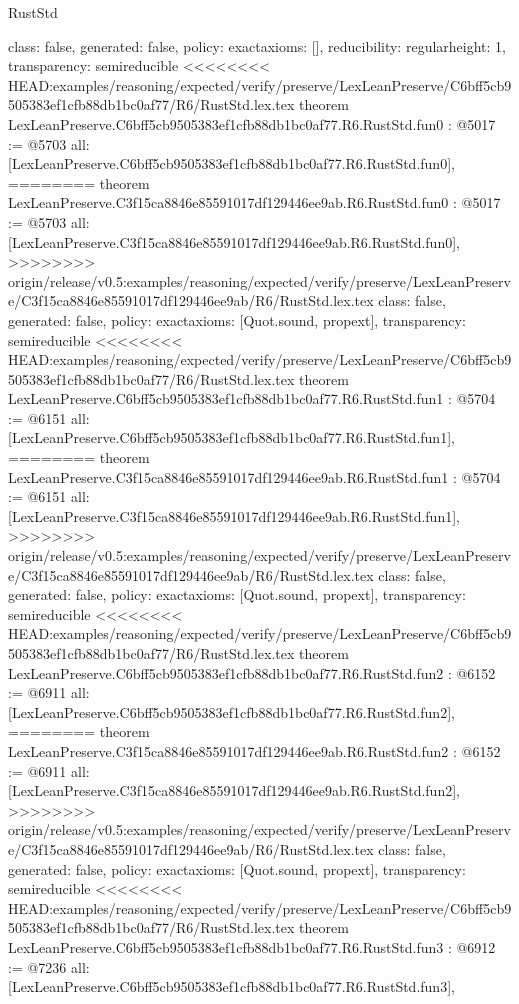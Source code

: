 \begin{lexlean}{RustStd}
\begin{coremodule}
{\begin{coremodule}
{{{  class: false,
  generated: false,
  policy: exact{axioms: []},
  reducibility: regular{height: 1},
  transparency: semireducible
}
<<<<<<<< HEAD:examples/reasoning/expected/verify/preserve/LexLeanPreserve/C6bff5cb9505383ef1cfb88db1bc0af77/R6/RustStd.lex.tex
theorem LexLeanPreserve.C6bff5cb9505383ef1cfb88db1bc0af77.R6.RustStd.fun0 : @5017 := @5703 {
  all: [LexLeanPreserve.C6bff5cb9505383ef1cfb88db1bc0af77.R6.RustStd.fun0],
========
theorem LexLeanPreserve.C3f15ca8846e85591017df129446ee9ab.R6.RustStd.fun0 : @5017 := @5703 {
  all: [LexLeanPreserve.C3f15ca8846e85591017df129446ee9ab.R6.RustStd.fun0],
>>>>>>>> origin/release/v0.5:examples/reasoning/expected/verify/preserve/LexLeanPreserve/C3f15ca8846e85591017df129446ee9ab/R6/RustStd.lex.tex
  class: false,
  generated: false,
  policy: exact{axioms: [Quot.sound, propext]},
  transparency: semireducible
}
<<<<<<<< HEAD:examples/reasoning/expected/verify/preserve/LexLeanPreserve/C6bff5cb9505383ef1cfb88db1bc0af77/R6/RustStd.lex.tex
theorem LexLeanPreserve.C6bff5cb9505383ef1cfb88db1bc0af77.R6.RustStd.fun1 : @5704 := @6151 {
  all: [LexLeanPreserve.C6bff5cb9505383ef1cfb88db1bc0af77.R6.RustStd.fun1],
========
theorem LexLeanPreserve.C3f15ca8846e85591017df129446ee9ab.R6.RustStd.fun1 : @5704 := @6151 {
  all: [LexLeanPreserve.C3f15ca8846e85591017df129446ee9ab.R6.RustStd.fun1],
>>>>>>>> origin/release/v0.5:examples/reasoning/expected/verify/preserve/LexLeanPreserve/C3f15ca8846e85591017df129446ee9ab/R6/RustStd.lex.tex
  class: false,
  generated: false,
  policy: exact{axioms: [Quot.sound, propext]},
  transparency: semireducible
}
<<<<<<<< HEAD:examples/reasoning/expected/verify/preserve/LexLeanPreserve/C6bff5cb9505383ef1cfb88db1bc0af77/R6/RustStd.lex.tex
theorem LexLeanPreserve.C6bff5cb9505383ef1cfb88db1bc0af77.R6.RustStd.fun2 : @6152 := @6911 {
  all: [LexLeanPreserve.C6bff5cb9505383ef1cfb88db1bc0af77.R6.RustStd.fun2],
========
theorem LexLeanPreserve.C3f15ca8846e85591017df129446ee9ab.R6.RustStd.fun2 : @6152 := @6911 {
  all: [LexLeanPreserve.C3f15ca8846e85591017df129446ee9ab.R6.RustStd.fun2],
>>>>>>>> origin/release/v0.5:examples/reasoning/expected/verify/preserve/LexLeanPreserve/C3f15ca8846e85591017df129446ee9ab/R6/RustStd.lex.tex
  class: false,
  generated: false,
  policy: exact{axioms: [Quot.sound, propext]},
  transparency: semireducible
}
<<<<<<<< HEAD:examples/reasoning/expected/verify/preserve/LexLeanPreserve/C6bff5cb9505383ef1cfb88db1bc0af77/R6/RustStd.lex.tex
theorem LexLeanPreserve.C6bff5cb9505383ef1cfb88db1bc0af77.R6.RustStd.fun3 : @6912 := @7236 {
  all: [LexLeanPreserve.C6bff5cb9505383ef1cfb88db1bc0af77.R6.RustStd.fun3],
}}}}}}
\end{coremodule}}
\end{coremodule}
\end{lexlean}
